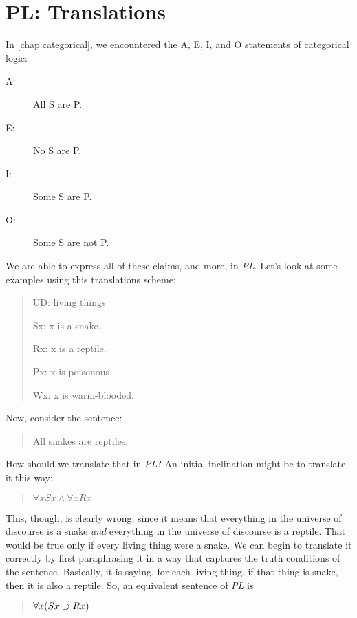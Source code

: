 \documentclass[../logic-text.tex]{subfiles}
\begin{document}
\section{PL: Translations}
\label{sec:pl-translations}

In \ref{chap:categorical}, we encountered the A, E, I, and O statements of categorical logic:

\begin{description}
\item[A:] All S are P.
\item[E:] No S are P.
\item[I:] Some S are P.
\item[O:] Some S are not P.
\end{description}

\noindent We are able to express all of these claims, and more, in \emph{PL}.
Let's look at some examples using this translations scheme:

\begin{quote}
  UD: living things

  Sx: x is a snake.

  Rx: x is a reptile.

  Px: x is poisonous.

  Wx: x is warm-blooded.
\end{quote}

Now, consider the sentence:

\begin{quote}
  All snakes are reptiles.
\end{quote}

\noindent How should we translate that in \emph{PL}? An initial inclination might be to translate it this way:

\begin{quote}
  \(\forall xSx \land \forall xRx\)
\end{quote}

This, though, is clearly wrong, since it means that everything in the universe of discourse is a snake \emph{and} everything in the universe of discourse is a reptile.
That would be true only if every living thing were a snake.
We can begin to translate it correctly by first paraphrasing it in a way that captures the truth conditions of the sentence.
Basically, it is saying, for each living thing, if that thing is snake, then it is also a reptile.
So, an equivalent sentence of \emph{PL} is

\begin{quote}
  \(\forall x(Sx \supset Rx)\)
\end{quote}
\end{document}

